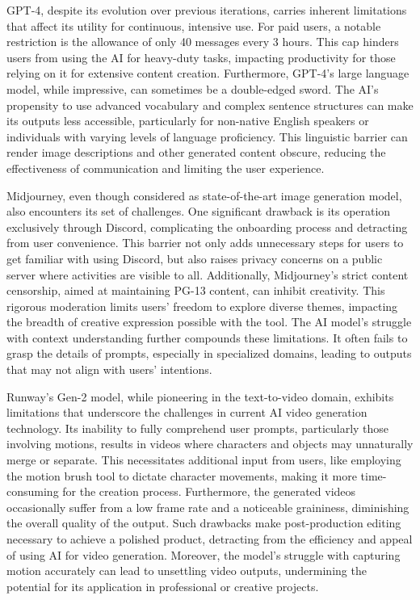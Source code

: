 \documentclass[11pt,a4paper,oneside]{report}
\begin{document}
GPT-4, despite its evolution over previous iterations, carries inherent limitations that affect its utility for continuous, intensive use. 
For paid users, a notable restriction is the allowance of only 40 messages every 3 hours. 
This cap hinders users from using the AI for heavy-duty tasks, impacting productivity for those relying on it for extensive content creation.
Furthermore, GPT-4's large language model, while impressive, can sometimes be a double-edged sword. 
The AI's propensity to use advanced vocabulary and complex sentence structures can make its outputs less accessible, particularly for non-native English speakers or individuals with varying levels of language proficiency. 
This linguistic barrier can render image descriptions and other generated content obscure, reducing the effectiveness of communication and limiting the user experience.

Midjourney, even though considered as state-of-the-art image generation model, also encounters its set of challenges. 
One significant drawback is its operation exclusively through Discord, complicating the onboarding process and detracting from user convenience. 
This barrier not only adds unnecessary steps for users to get familiar with using Discord, but also raises privacy concerns on a public server where activities are visible to all. 
Additionally, Midjourney's strict content censorship, aimed at maintaining PG-13 content, can inhibit creativity. 
This rigorous moderation limits users' freedom to explore diverse themes, impacting the breadth of creative expression possible with the tool. 
The AI model's struggle with context understanding further compounds these limitations. 
It often fails to grasp the details of prompts, especially in specialized domains, leading to outputs that may not align with users' intentions.

Runway's Gen-2 model, while pioneering in the text-to-video domain, exhibits limitations that underscore the challenges in current AI video generation technology. 
Its inability to fully comprehend user prompts, particularly those involving motions, results in videos where characters and objects may unnaturally merge or separate. 
This necessitates additional input from users, like employing the motion brush tool to dictate character movements, making it more time-consuming for the creation process. 
Furthermore, the generated videos occasionally suffer from a low frame rate and a noticeable graininess, diminishing the overall quality of the output. 
Such drawbacks make post-production editing necessary to achieve a polished product, detracting from the efficiency and appeal of using AI for video generation. 
Moreover, the model's struggle with capturing motion accurately can lead to unsettling video outputs, undermining the potential for its application in professional or creative projects.
\end{document}

